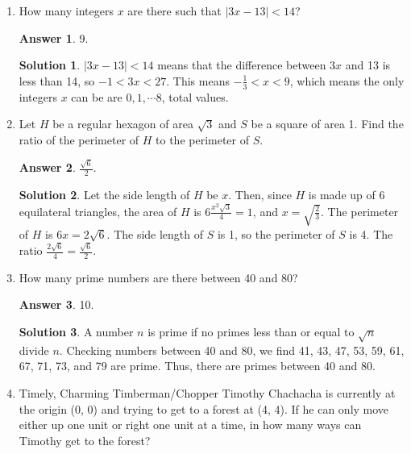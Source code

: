 \documentclass[11pt]{article}
\theoremstyle{definition}
\newtheorem*{solution}{Solution}
\newtheorem*{answer}{Answer}
\begin{document}
\begin{enumerate}
\setcounter{enumi}{0}

\item How many integers $x$ are there such that $\left| 3x - 13 \right| < 14$?

\begin{answer}
9.
\end{answer}
\begin{solution} $\left| 3x - 13 \right| < 14$ means that the difference between $3x$ and 13 is less than 14, so $-1 < 3x < 27$. This means $-\frac{1}{3} < x < 9$, which means the only integers $x$ can be are $0, 1, \cdots 8$,  total values.

\end{solution}

\item Let $H$ be a regular hexagon of area $\sqrt{3}$ and $S$ be a square of area 1. Find the ratio of the perimeter of $H$ to the perimeter of $S$.

\begin{answer}
$\frac{\sqrt{6}}{2}$.
\end{answer}
\begin{solution} Let the side length of $H$ be $x$. Then, since $H$ is made up of 6 equilateral triangles, the area of $H$ is $\displaystyle 6 \frac{x^2 \sqrt{3}}{4} = 1$, and $\displaystyle x = \sqrt{\frac{2}{3}}$. The perimeter of $H$ is $6x = 2\sqrt{6}$. The side length of $S$ is 1, so the perimeter of $S$ is 4. The ratio $\frac{2\sqrt{6}}{4} = \boxed{\frac{\sqrt{6}}{2}}$.

\end{solution}

\item How many prime numbers are there between 40 and 80?

\begin{answer}
10.
\end{answer}
\begin{solution} A number $n$ is prime if no primes less than or equal to $\sqrt{n}$ divide $n$. Checking numbers between 40 and 80, we find 41, 43, 47, 53, 59, 61, 67, 71, 73, and 79 are prime. Thus, there are  primes between 40 and 80.

\end{solution}

\item Timely, Charming Timberman/Chopper Timothy Chachacha is currently at the origin (0, 0) and trying to get to a forest at (4, 4). If he can only move either up one unit or right one unit at a time, in how many ways can Timothy get to the forest?


\end{enumerate}
\end{document}
